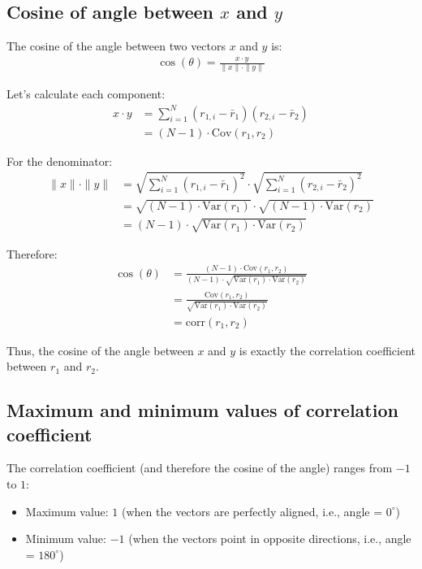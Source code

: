 \documentclass{article}
\begin{document}
\subsection{Cosine of angle between $x$ and $y$}
The cosine of the angle between two vectors $x$ and $y$ is:
\begin{align}
\cos(\theta) = \frac{x \cdot y}{\|x\| \cdot \|y\|}
\end{align}

Let's calculate each component:
\begin{align}
x \cdot y &= \sum_{i=1}^{N}(r_{1,i} - \bar{r}_1)(r_{2,i} - \bar{r}_2) \\
&= (N-1) \cdot \text{Cov}(r_1, r_2)
\end{align}

For the denominator:
\begin{align}
\|x\| \cdot \|y\| &= \sqrt{\sum_{i=1}^{N}(r_{1,i} - \bar{r}_1)^2} \cdot \sqrt{\sum_{i=1}^{N}(r_{2,i} - \bar{r}_2)^2} \\
&= \sqrt{(N-1) \cdot \text{Var}(r_1)} \cdot \sqrt{(N-1) \cdot \text{Var}(r_2)} \\
&= (N-1) \cdot \sqrt{\text{Var}(r_1) \cdot \text{Var}(r_2)}
\end{align}

Therefore:
\begin{align}
\cos(\theta) &= \frac{(N-1) \cdot \text{Cov}(r_1, r_2)}{(N-1) \cdot \sqrt{\text{Var}(r_1) \cdot \text{Var}(r_2)}} \\
&= \frac{\text{Cov}(r_1, r_2)}{\sqrt{\text{Var}(r_1) \cdot \text{Var}(r_2)}} \\
&= \text{corr}(r_1, r_2)
\end{align}

Thus, the cosine of the angle between $x$ and $y$ is exactly the correlation coefficient between $r_1$ and $r_2$.

\subsection{Maximum and minimum values of correlation coefficient}
The correlation coefficient (and therefore the cosine of the angle) ranges from $-1$ to $1$:
\begin{itemize}
\item Maximum value: $1$ (when the vectors are perfectly aligned, i.e., angle = $0^\circ$)
\item Minimum value: $-1$ (when the vectors point in opposite directions, i.e., angle = $180^\circ$)
\end{itemize}
\end{document}
